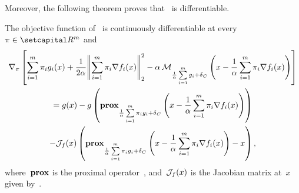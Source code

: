 \documentclass[../../main]{subfiles}
\begin{document}
                        Moreover, the following theorem proves that~ is differentiable.
                        \begin{theorem} 
                            The objective function of~ is continuously differentiable at every~$\pi \in \setR^m$ and
                            \begin{multline}
                                \nabla_\pi \left[ \sum_{i = 1}^{m} \pi_i g_i(x) + \frac{1}{2 \alpha} \norm*{\sum_{i = 1}^{m} \pi_i \nabla f_i(x)}_2^2 - \alpha \envelope_{\frac{1}{\alpha} \sum\limits_{i = 1}^{m} g_i + \indicator_C}\left( x - \frac{1}{\alpha} \sum_{i = 1}^{m} \pi_i \nabla f_i(x) \right)  \right] \\
                                = g(x) - g\left( \prox_{\frac{1}{\alpha} \sum\limits_{i = 1}^{m} \pi_i g_i + \indicator_C}\left( x - \frac{1}{\alpha} \sum_{i = 1}^{m} \pi_i \nabla f_i(x) \right) \right) \\
                                - \jdv{f}{x} \left( \prox_{\frac{1}{\alpha} \sum\limits_{i = 1}^{m} \pi_i g_i + \indicator_C}\left( x - \frac{1}{\alpha} \sum_{i = 1}^{m} \pi_i \nabla f_i(x) \right) - x \right) 
                            ,\end{multline}
                            where~$\operatorname{\mathbf{prox}}$ is the proximal operator~, and~$\mathcal{J}_{f}(x)$ is the Jacobian matrix at~$x$ given by~.
                        \end{theorem}
\end{document}
